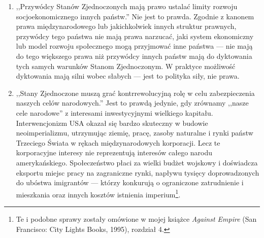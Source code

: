 \documentclass[12pt]{book}
\begin{document}
\begin{enumerate}
  \item ,,Przywódcy Stanów Zjednoczonych mają prawo ustalać limity rozwoju socjoekonomicznego innych państw.'' Nie jest to prawda. Zgodnie z kanonem prawa międzynarodowego lub jakichkolwiek innych struktur prawnych, przywódcy tego państwa nie mają prawa narzucać, jaki system ekonomiczny lub model rozwoju społecznego mogą przyjmować inne państwa — nie mają do tego większego prawa niż przywódcy innych państw mają do dyktowania tych samych warunków Stanom Zjednoczonym. W praktyce możliwość dyktowania mają silni wobec słabych — jest to polityka siły, nie prawa.
  \item ,,Stany Zjednoczone muszą grać kontrrewolucyjną rolę w celu zabezpieczenia naszych celów narodowych.'' Jest to prawdą jedynie, gdy zrównamy ,,nasze cele narodowe'' z interesami inwestycyjnymi wielkiego kapitału. Interwencjonizm USA okazał się bardzo skuteczny w budowie neoimperializmu, utrzymując ziemię, pracę, zasoby naturalne i rynki państw Trzeciego Świata w rękach międzynarodowych korporacji. Lecz te korporacyjne interesy nie reprezentują interesów całego narodu amerykańskiego. Społeczeństwo płaci za wielki budżet wojskowy i doświadcza eksportu miejsc pracy na zagraniczne rynki, napływu tysięcy doprowadzonych do ubóstwa imigrantów — którzy konkurują o ograniczone zatrudnienie i mieszkania oraz innych kosztów istnienia imperium\footnote{Te i podobne sprawy zostały omówione w mojej książce \textit{Against Empire} (San Francisco: City Lights Books, 1995), rozdział 4.}.


\end{enumerate}
\end{document}
